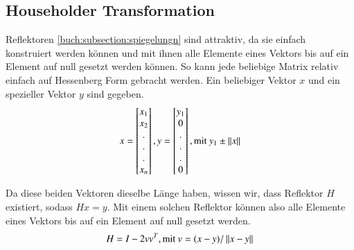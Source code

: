 \subsection{Householder Transformation\label{francis:section:grundlagen:householder}}
Reflektoren \ref{buch:subsection:spiegelungn} sind attraktiv, da sie einfach konstruiert werden können und mit ihnen alle Elemente eines Vektors bis auf ein Element auf null gesetzt werden können.
So kann jede beliebige Matrix relativ einfach auf Hessenberg Form gebracht werden.
Ein beliebiger Vektor $x$ und ein spezieller Vektor $y$ sind gegeben.
\begin{equation}
	x=
	\begin{bmatrix}
	x_{1}\\
	x_{2}\\
	.\\
	.\\
	.\\
	x_{n}\\
	\end{bmatrix}
	,
	y=
	\begin{bmatrix}
	y_{1}\\
	0\\
	.\\
	.\\
	.\\
	0\\
	\end{bmatrix}, \text{mit } y_{1}\pm \left\lVert x\right\rVert	
\end{equation}

Da diese beiden Vektoren dieselbe Länge haben, wissen wir, dass Reflektor $H$ existiert, sodass $Hx=y$.
Mit einem solchen Reflektor können also alle Elemente eines Vektors bis auf ein Element auf null gesetzt werden.
\begin{equation}
	H=I-2vv^{T}, \text{mit } v=(x-y)/\left\lVert x-y\right\rVert
\end{equation}

